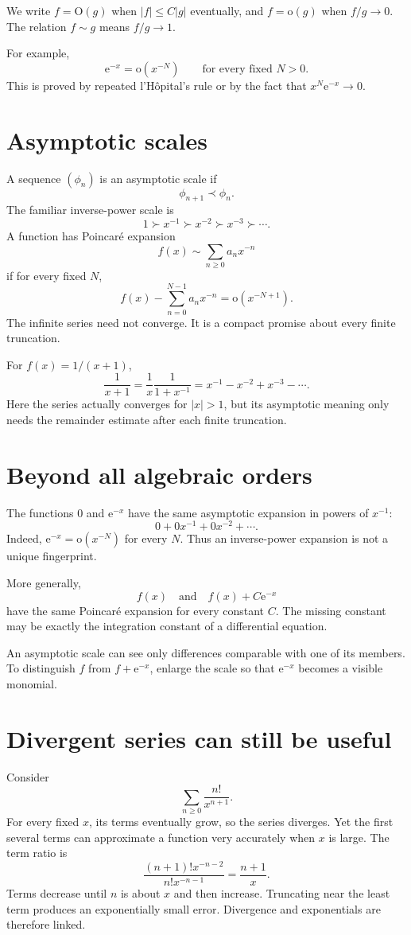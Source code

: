 \documentclass[11pt,oneside,openany]{book}
\newcommand{\e}{\mathrm{e}}
\newcommand{\smallo}{\mathrm{o}}
\newcommand{\bigO}{\mathrm{O}}
\theoremstyle{plain}
\theoremstyle{definition}
\theoremstyle{remark}
\begin{document}
We write $f=\bigO(g)$ when $|f|\le C|g|$ eventually, and $f=\smallo(g)$ when $f/g\to0$. The relation $f\sim g$ means $f/g\to1$.

For example,
\[
  \e^{-x}=\smallo(x^{-N})
  \qquad\text{for every fixed }N>0.
\]
This is proved by repeated l'Hôpital's rule or by the fact that $x^N\e^{-x}\to0$.

\section{Asymptotic scales}
A sequence $(\phi_n)$ is an asymptotic scale if
\[
  \phi_{n+1}\prec\phi_n.
\]
The familiar inverse-power scale is
\[
  1\succ x^{-1}\succ x^{-2}\succ x^{-3}\succ\cdots.
\]
A function has Poincaré expansion
\[
  f(x)\sim\sum_{n\ge0}a_nx^{-n}
\]
if for every fixed $N$,
\[
  f(x)-\sum_{n=0}^{N-1}a_nx^{-n}
  =\smallo(x^{-N+1}).
\]
The infinite series need not converge. It is a compact promise about every finite truncation.

\begin{worked}
For $f(x)=1/(x+1)$,
\[
  \frac1{x+1}=\frac1x\frac1{1+x^{-1}}
  =x^{-1}-x^{-2}+x^{-3}-\cdots.
\]
Here the series actually converges for $|x|>1$, but its asymptotic meaning only needs the remainder estimate after each finite truncation.
\end{worked}

\section{Beyond all algebraic orders}
The functions $0$ and $\e^{-x}$ have the same asymptotic expansion in powers of $x^{-1}$:
\[
  0+0x^{-1}+0x^{-2}+\cdots.
\]
Indeed, $\e^{-x}=\smallo(x^{-N})$ for every $N$. Thus an inverse-power expansion is not a unique fingerprint.

More generally,
\[
  f(x)
  \quad\text{and}\quad
  f(x)+C\e^{-x}
\]
have the same Poincaré expansion for every constant $C$. The missing constant may be exactly the integration constant of a differential equation.

\begin{bigidea}
An asymptotic scale can see only differences comparable with one of its members. To distinguish $f$ from $f+\e^{-x}$, enlarge the scale so that $\e^{-x}$ becomes a visible monomial.
\end{bigidea}

\section{Divergent series can still be useful}
Consider
\[
  \sum_{n\ge0}\frac{n!}{x^{n+1}}.
\]
For every fixed $x$, its terms eventually grow, so the series diverges. Yet the first several terms can approximate a function very accurately when $x$ is large. The term ratio is
\[
  \frac{(n+1)!x^{-n-2}}{n!x^{-n-1}}=\frac{n+1}{x}.
\]
Terms decrease until $n$ is about $x$ and then increase. Truncating near the least term produces an exponentially small error. Divergence and exponentials are therefore linked.
\end{document}
